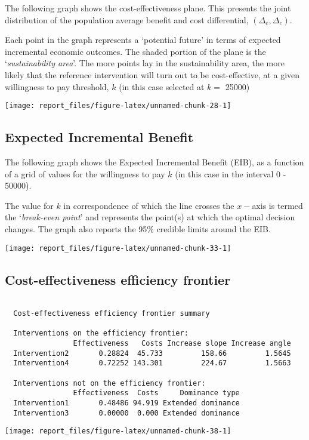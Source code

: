 \documentclass[
]{article}
\begin{document}
The following graph shows the cost-effectiveness plane. This presents
the joint distribution of the population average benefit and cost
differential, \((\Delta_e,\Delta_c)\).

Each point in the graph represents a `potential future' in terms of
expected incremental economic outcomes. The shaded portion of the plane
is the `\emph{sustainability area}'. The more points lay in the
sustainability area, the more likely that the reference intervention
will turn out to be cost-effective, at a given willingness to pay
threshold, \(k\) (in this case selected at \(k=\) 25000)

\begin{center}\texttt{[image: report\_files/figure-latex/unnamed-chunk-28-1]} \end{center}

\hypertarget{expected-incremental-benefit}{%
\subsection{Expected Incremental
Benefit}\label{expected-incremental-benefit}}

The following graph shows the Expected Incremental Benefit (EIB), as a
function of a grid of values for the willingness to pay \(k\) (in this
case in the interval 0 - 50000).

The value for \(k\) in correspondence of which the line crosses the
\(x-\)axis is termed the `\emph{break-even point}' and represents the
point(s) at which the optimal decision changes. The graph also reports
the 95\% credible limits around the EIB.

\begin{center}\texttt{[image: report\_files/figure-latex/unnamed-chunk-33-1]} \end{center}

\hypertarget{cost-effectiveness-efficiency-frontier}{%
\subsection{Cost-effectiveness efficiency
frontier}\label{cost-effectiveness-efficiency-frontier}}

\begin{verbatim}
  
  Cost-effectiveness efficiency frontier summary 
  
  Interventions on the efficiency frontier:
                Effectiveness   Costs Increase slope Increase angle
  Intervention2       0.28824  45.733         158.66         1.5645
  Intervention4       0.72252 143.301         224.67         1.5663
  
  Interventions not on the efficiency frontier:
                Effectiveness  Costs     Dominance type
  Intervention1       0.48486 94.919 Extended dominance
  Intervention3       0.00000  0.000 Extended dominance
\end{verbatim}

\begin{center}\texttt{[image: report\_files/figure-latex/unnamed-chunk-38-1]} \end{center}
\end{document}
